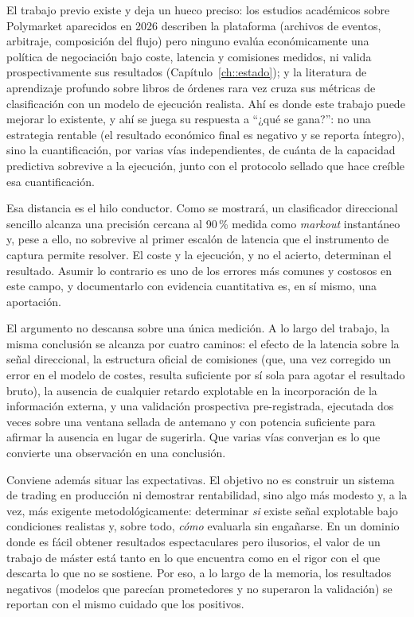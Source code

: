 El trabajo previo existe y deja un hueco preciso: los estudios
académicos sobre Polymarket aparecidos en 2026 describen la plataforma (archivos de
eventos, arbitraje, composición del flujo) pero ninguno evalúa económicamente una
política de negociación bajo coste, latencia y comisiones medidos, ni valida
prospectivamente sus resultados (Capítulo~\ref{ch::estado}); y la literatura de
aprendizaje profundo sobre libros de órdenes rara vez cruza sus métricas de clasificación
con un modelo de ejecución realista. Ahí es donde este trabajo puede mejorar lo
existente, y ahí se juega su respuesta a ``¿qué se gana?'': no una estrategia rentable
(el resultado económico final es negativo y se reporta íntegro), sino la cuantificación,
por varias vías independientes, de cuánta de la capacidad predictiva sobrevive a la
ejecución, junto con el protocolo sellado que hace creíble esa cuantificación.

Esa distancia es el hilo conductor. Como se mostrará, un clasificador direccional sencillo
alcanza una precisión cercana al 90\,\% medida como \emph{markout} instantáneo y, pese a
ello, no sobrevive al primer escalón de latencia que el instrumento de captura permite
resolver. El coste y la ejecución, y no el acierto, determinan el resultado. Asumir lo
contrario es uno de los errores más comunes y costosos en este campo, y documentarlo con
evidencia cuantitativa es, en sí mismo, una aportación.

El argumento no descansa sobre una única medición. A lo largo del trabajo, la misma
conclusión se alcanza por cuatro caminos: el efecto de la latencia sobre la señal
direccional, la estructura oficial de comisiones (que, una vez corregido un error en el
modelo de costes, resulta suficiente por sí sola para agotar el resultado bruto), la
ausencia de cualquier retardo explotable en la incorporación de la información externa, y
una validación prospectiva pre-registrada, ejecutada dos veces sobre una ventana sellada
de antemano y con potencia suficiente para afirmar la ausencia en lugar de sugerirla.
Que varias vías converjan es lo que convierte una observación en una conclusión.

Conviene además situar las expectativas. El objetivo no es construir un sistema de trading en
producción ni demostrar rentabilidad, sino algo más modesto y, a la vez, más exigente
metodológicamente: determinar \emph{si} existe señal explotable bajo condiciones realistas y,
sobre todo, \emph{cómo} evaluarla sin engañarse. En un dominio donde es fácil obtener
resultados espectaculares pero ilusorios, el valor de un trabajo de máster está tanto en lo
que encuentra como en el rigor con el que descarta lo que no se sostiene. Por eso, a lo largo
de la memoria, los resultados negativos (modelos que parecían prometedores y no superaron la
validación) se reportan con el mismo cuidado que los positivos.

